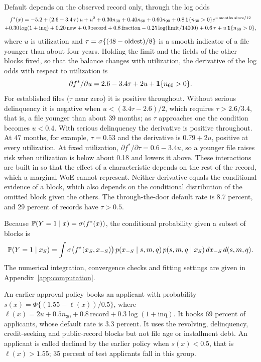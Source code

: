 Default depends on the observed record only, through the log odds
\begin{multline}\label{eq:truth}
f^\ast(x)=-5.2+(2.6-3.4\,\tau)\,u+u^2+0.30n_{30}+0.40n_{60}+0.60n_{90}+0.8\,\mathbf 1\{n_{30}>0\}e^{-\text{months since}/12}\\
+0.30\log(1+\text{inq})+0.20\,\text{new}+0.9\,\text{record}+0.8\,\text{fraction}-0.25\log(\text{limit}/14000)+0.6\,\tau+u\,\mathbf 1\{n_{60}>0\},
\end{multline}
where $u$ is utilization and $\tau=\sigma\{(48-\text{oldest})/8\}$ is a smooth indicator of a file younger than about four years. Holding the limit and the fields of the other blocks fixed, so that the balance changes with utilization, the derivative of the log odds with respect to utilization is
\[
\partial f^\ast/\partial u=2.6-3.4\tau+2u+\mathbf 1\{n_{60}>0\}.
\]
For established files ($\tau$ near zero) it is positive throughout. Without serious delinquency it is negative when $u<(3.4\tau-2.6)/2$, which requires $\tau>2.6/3.4$, that is, a file younger than about 39 months; as $\tau$ approaches one the condition becomes $u<0.4$. With serious delinquency the derivative is positive throughout. At 47 months, for example, $\tau=0.53$ and the derivative is $0.79+2u$, positive at every utilization. At fixed utilization, $\partial f^\ast/\partial\tau=0.6-3.4u$, so a younger file raises risk when utilization is below about 0.18 and lowers it above. These interactions are built in so that the effect of a characteristic depends on the rest of the record, which a marginal WoE cannot represent. Neither derivative equals the conditional evidence of a block, which also depends on the conditional distribution of the omitted block given the others. The through-the-door default rate is 8.7 percent, and 29 percent of records have $\tau>0.5$.

Because $\mathbb P(Y=1\mid x)=\sigma(f^\ast(x))$, the conditional probability given a subset of blocks is
\[
\mathbb P(Y=1\mid x_S)=\int \sigma\bigl(f^\ast(x_S,x_{-S})\bigr)\,p(x_{-S}\mid s,m,q)\,p(s,m,q\mid x_S)\,d x_{-S}\,d(s,m,q).
\]
The numerical integration, convergence checks and fitting settings are given in Appendix~\ref{app:computation}.

An earlier approval policy books an applicant with probability $s(x)=\Phi\{(1.55-\ell(x))/0.5\}$, where $\ell(x)=2u+0.5n_{30}+0.8\,\text{record}+0.3\log(1+\text{inq})$. It books 69 percent of applicants, whose default rate is 3.3 percent. It uses the revolving, delinquency, credit-seeking and public-record blocks but not file age or installment debt. An applicant is called declined by the earlier policy when $s(x)<0.5$, that is $\ell(x)>1.55$; 35 percent of test applicants fall in this group.

